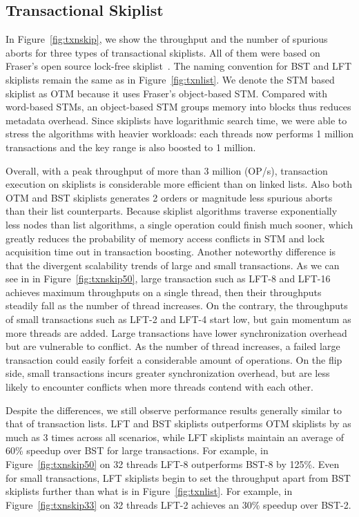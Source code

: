 \documentclass[]{sig-alternate-05-2015}
\begin{document}
\subsection{Transactional Skiplist}
\label{sec:txnskiplistexp}
In Figure~\ref{fig:txnskip}, we show the throughput and the number of spurious aborts for three types of transactional skiplists.
All of them were based on Fraser's open source lock-free skiplist~\cite{fraser2004practical}. 
The naming convention for BST and LFT skiplists remain the same as in Figure~\ref{fig:txnlist}.
We denote the STM based skiplist as OTM because it uses Fraser's object-based STM.
Compared with word-based STMs, an object-based STM groups memory into blocks thus reduces metadata overhead.
Since skiplists have logarithmic search time, we were able to stress the algorithms with heavier workloads: each threads now performs 1 million transactions and the key range is also boosted to 1 million.

Overall, with a peak throughput of more than 3 million (OP/s), transaction execution on skiplists is considerable more efficient than on linked lists.
Also both OTM and BST skiplists generates 2 orders or magnitude less spurious aborts than their list counterparts.
Because skiplist algorithms traverse exponentially less nodes than list algorithms, a single operation could finish much sooner, which greatly reduces the probability of memory access conflicts in STM and lock acquisition time out in transaction boosting.
Another noteworthy difference is that the divergent scalability trends of large and small transactions. 
As we can see in in Figure~\ref{fig:txnskip50}, large transaction such as LFT-8 and LFT-16 achieves maximum throughputs on a single thread, then their throughputs steadily fall as the number of thread increases.
On the contrary, the throughputs of small transactions such as LFT-2 and LFT-4 start low, but gain momentum as more threads are added.
Large transactions have lower synchronization overhead but are vulnerable to conflict.
As the number of thread increases, a failed large transaction could easily forfeit a considerable amount of operations.
On the flip side, small transactions incurs greater synchronization overhead, but are less likely to encounter conflicts when more threads contend with each other.

Despite the differences, we still observe performance results generally similar to that of transaction lists.
LFT and BST skiplists outperforms OTM skiplists by as much as 3 times across all scenarios, while LFT skiplists maintain an average of 60\% speedup over BST for large transactions.
For example, in Figure~\ref{fig:txnskip50} on 32 threads LFT-8 outperforms BST-8 by 125\%.
Even for small transactions, LFT skiplists begin to set the throughput apart from BST skiplists further than what is in Figure~\ref{fig:txnlist}.
For example, in Figure~\ref{fig:txnskip33} on 32 threads LFT-2 achieves an 30\% speedup over BST-2.
\end{document}
